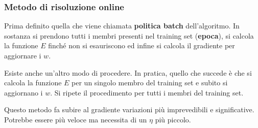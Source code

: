 \subsubsection{Metodo di risoluzione online}
Prima definito quella che viene chiamata \textbf{politica batch} dell'algoritmo. In sostanza si prendono tutti i membri
presenti nel training set (\textbf{epoca}), si calcola la funzione $E$ finch\'e non si esauriscono ed infine si calcola
il gradiente per aggiornare i $w$.

Esiste anche un'altro modo di procedere. In pratica, quello che succede \`e che si calcola la funzione $E$ per un singolo
membro del training set e subito si aggiornano i $w$. Si ripete il procedimento per tutti i membri del training set.

Questo metodo fa subire al gradiente variazioni pi\`u imprevedibili e significative. Potrebbe essere pi\`u veloce ma
necessita di un $\eta$ pi\`u piccolo.

